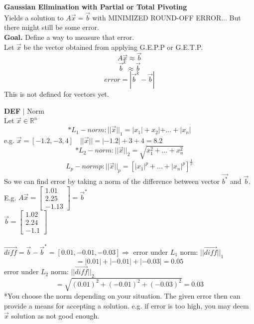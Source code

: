 \documentclass [12pt]{article}
\begin{document}
\textbf{Gaussian Elimination with Partial or Total Pivoting}\\
Yields a solution to $A\overrightarrow{x}=\overrightarrow{b}$ with MINIMIZED ROUND-OFF ERROR... But there might still be some error.\\
\textbf{Goal.} Define a way to measure that error. \\
Let $\overrightarrow{x}$ be the vector obtained from applying G.E.P.P or G.E.T.P.
\[A\overrightarrow{x}\approx \overrightarrow{b}\]
\[\overrightarrow{b}^k\approx \overrightarrow{b}\]
\[error=|\overrightarrow{b}^k-\overrightarrow{b}|\]
This is not defined for vectors yet.\\
\begin{framed}
\textbf{DEF} $|$ Norm\\
Let $\overrightarrow{x}\in\mathbb{R}^n$\\
\[*L_1-norm: ||\overrightarrow{x}||_1=|x_1|+x_2|+...+|x_n|\]
e.g. $\overrightarrow{x}=[-1.2,-3,4]\quad ||\overrightarrow{x}||=|-1.2|+3+4=8.2$
\[*L_2-norm: ||\overrightarrow{x}||_2=\sqrt{x_1^2+...+x_n^2}\]
\[L_p-normp:||\overrightarrow{x}||_p=[|x_1|^p+...+|x_n|^p]^{\frac{1}{p}}\]
So we can find error by taking a norm of the difference between vector $\overrightarrow{b^*}$ and $\overrightarrow{b}$.\\
E.g. $A\overrightarrow{x}=\begin{bmatrix}
1.01\\
2.25\\
-1.13
\end{bmatrix}=\overrightarrow{b}^*$\\
$\overrightarrow{b}=\begin{bmatrix}
1.02\\
2.24\\
-1.1
\end{bmatrix}$\\\\
$\overrightarrow{diff}=\overrightarrow{b}-\overrightarrow{b}^*=[0.01,-0.01,-0.03]\Rightarrow$ error under $L_1$ norm: $||\overrightarrow{diff}||_1$
\[=|0.01|+|-0.01|+|-0.03|=0.05\]
error under $L_2$ norm: $||\overrightarrow{diff}||_2$
\[=\sqrt{(0.01)^2+(-0.01)^2+(-0.03)^2}=0.03\]
*You choose the norm depending on your situation. The given error then can provide a means for accepting a solution. e.g. if error is too high, you may deem $\overrightarrow{x}$ solution as not good enough. 
\end{framed}
\end{document}
